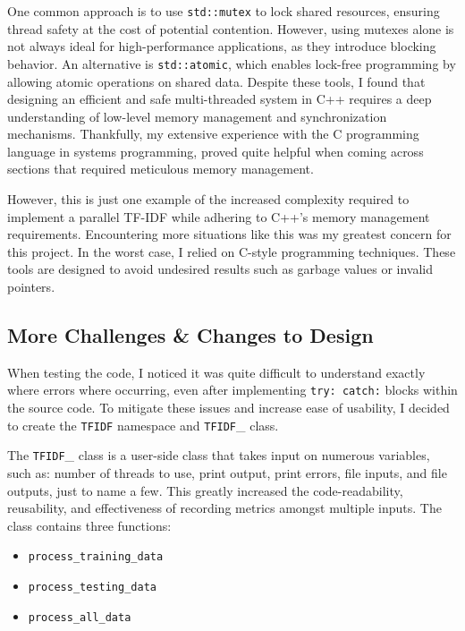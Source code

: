 \documentclass[conference]{IEEEtran}
\newcommand{\code}[1]{\lstinline[basicstyle=\ttfamily]|#1|}
\begin{document}
One common approach is to use \code{std::mutex} to lock shared resources, ensuring thread safety at the cost of potential contention. However, using mutexes alone is not always ideal for high-performance applications, as they introduce blocking behavior. An alternative is \code{std::atomic}, which enables lock-free programming by allowing atomic operations on shared data. Despite these tools, I found that designing an efficient and safe multi-threaded system in C++ requires a deep understanding of low-level memory management and synchronization mechanisms. Thankfully, my extensive experience with the C programming language in systems programming, proved quite helpful when coming across sections that required meticulous memory management.

However, this is just one example of the increased complexity required to implement a parallel TF-IDF while adhering to C++’s memory management requirements. Encountering more situations like this was my greatest concern for this project. In the worst case, I relied on C-style programming techniques. These tools are designed to avoid undesired results such as garbage values or invalid pointers.

\subsection{More Challenges \& Changes to Design}
When testing the code, I noticed it was quite difficult to understand exactly where errors where occurring, even after implementing \code{try: catch:} blocks within the source code. To mitigate these issues and increase ease of usability, I decided to create the \code{TFIDF} namespace and \code{TFIDF}\_ class.

The \code{TFIDF}\_ class is a user-side class that takes input on numerous variables, such as: number of threads to use, print output, print errors, file inputs, and file outputs, just to name a few. This greatly increased the code-readability, reusability, and effectiveness of recording metrics amongst multiple inputs. The class contains three functions:
\begin{itemize}
    \item \code{process_training_data} %
    \item \code{process_testing_data}%
    \item \code{process_all_data}%
\end{itemize}
\end{document}
